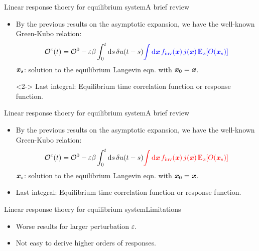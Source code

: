 \documentclass[fleqn]{beamer}
\newcommand{\redc}[1]{{\color{red} #1}}
\newcommand{\bluec}[1]{{\color{blue} #1}}
\newcommand{\whitec}[1]{{\color{white} #1}}
\newcommand{\vect}[1]{\textbf{\textit{#1}}}
\newcommand{\dd}[0]{\textrm{d}}
\newcommand{\fe}{u}
\newcommand{\eps}{\varepsilon}
\newcommand{\mo}{\mathcal O}
\newcommand{\inv}{\textrm{inv}}
\begin{document}
\begin{frame}{Linear response thoery for equilibrium system}{A brief review}
  \begin{itemize}
    \vfill
  \item <1-> By the previous results on the asymptotic expansion,
    we have the well-known Green-Kubo relation:
    \bluec{
      \begin{align*}
        \mo^\eps(t) = 
        \mo^0
        -
        \eps\beta
        \int_0^t\dd s\,
        \delta\fe(t-s)
        \bluec{
        \int \dd \vect x\,
        f_{\inv}(\vect x)\,
        j(\vect x)\,
        \mathbb E_{\vect x} [O(\vect x_s)]}
      \end{align*}
    }
    \bluec{$\vect x_s$}: solution to the \redc{equilibrium} Langevin eqn. with \bluec{$\vect x_0 = \vect x$}.
    \vfill
  \item[] <2-> \whitec{Last integral: {Equilibrium time correlation function} or {response function}.}
    \vfill
  \end{itemize}
\end{frame}

\begin{frame}{Linear response thoery for equilibrium system}{A brief review}
  \addtocounter{framenumber}{-1}
  \begin{itemize}
    \vfill
  \item <1-> By the previous results on the asymptotic expansion,
    we have the well-known Green-Kubo relation:
    \bluec{
      \begin{align*}
        \mo^\eps(t) = 
        \mo^0
        -
        \eps\beta
        \int_0^t\dd s\,
        \delta\fe(t-s)\redc{
        \int \dd \vect x\,
        f_{\inv}(\vect x)\,
        j(\vect x)\,
        \mathbb E_{\vect x} [O(\vect x_s)]}
      \end{align*}
    }
    \bluec{$\vect x_s$}: solution to the \redc{equilibrium} Langevin eqn. with \bluec{$\vect x_0 = \vect x$}.
    \vfill
  \item <1-> Last integral: \redc{Equilibrium time correlation function} or \redc{response function}.
    \vfill
    \end{itemize}
\end{frame}


\begin{frame}{Linear response thoery for equilibrium system}{Limitations}
  \begin{itemize}\itemsep 1cm
  \item <1-> Worse results for larger perturbation \bluec{$\eps$}.
  \item <2-> Not easy to derive higher orders of responses.
  \end{itemize}
\end{frame}
\end{document}
